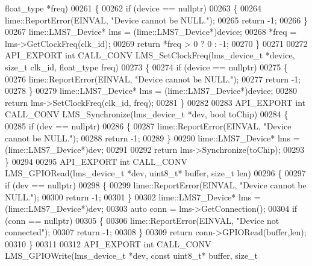 \begin{DoxyCode}
      float_type *freq)
00261 \{
00262     \textcolor{keywordflow}{if} (device == \textcolor{keyword}{nullptr})
00263     \{
00264         lime::ReportError(EINVAL, \textcolor{stringliteral}{"Device cannot be NULL."});
00265         \textcolor{keywordflow}{return} -1;
00266     \}
00267     lime::LMS7_Device* lms = (lime::LMS7_Device*)device;
00268     *freq = lms->GetClockFreq(clk\_id);
00269     \textcolor{keywordflow}{return} *freq > 0 ? 0 : -1;
00270 \}
00271 
00272 API_EXPORT \textcolor{keywordtype}{int} CALL_CONV LMS_SetClockFreq(lms_device_t *device, \textcolor{keywordtype}{size\_t} clk_id, 
      float_type freq)
00273 \{
00274     \textcolor{keywordflow}{if} (device == \textcolor{keyword}{nullptr})
00275     \{
00276         lime::ReportError(EINVAL, \textcolor{stringliteral}{"Device cannot be NULL."});
00277         \textcolor{keywordflow}{return} -1;
00278     \}
00279     lime::LMS7_Device* lms = (lime::LMS7_Device*)device;
00280     \textcolor{keywordflow}{return} lms->SetClockFreq(clk\_id, freq);
00281 \}
00282 
00283 API_EXPORT  \textcolor{keywordtype}{int} CALL_CONV LMS_Synchronize(lms_device_t *dev, \textcolor{keywordtype}{bool} toChip)
00284 \{
00285     \textcolor{keywordflow}{if} (dev == \textcolor{keyword}{nullptr})
00286     \{
00287         lime::ReportError(EINVAL, \textcolor{stringliteral}{"Device cannot be NULL."});
00288         \textcolor{keywordflow}{return} -1;
00289     \}
00290     lime::LMS7_Device* lms = (lime::LMS7_Device*)dev;
00291 
00292     \textcolor{keywordflow}{return} lms->Synchronize(toChip);
00293 \}
00294 
00295 API_EXPORT \textcolor{keywordtype}{int} CALL_CONV LMS_GPIORead(lms_device_t *dev,  uint8\_t* buffer, \textcolor{keywordtype}{size\_t} 
      len)
00296 \{
00297     \textcolor{keywordflow}{if} (dev == \textcolor{keyword}{nullptr})
00298     \{
00299         lime::ReportError(EINVAL, \textcolor{stringliteral}{"Device cannot be NULL."});
00300         \textcolor{keywordflow}{return} -1;
00301     \}
00302     lime::LMS7_Device* lms = (lime::LMS7_Device*)dev;
00303     \textcolor{keyword}{auto} conn = lms->GetConnection();
00304     \textcolor{keywordflow}{if} (conn == \textcolor{keyword}{nullptr})
00305     \{
00306         lime::ReportError(EINVAL, \textcolor{stringliteral}{"Device not connected"});
00307         \textcolor{keywordflow}{return} -1;
00308     \}
00309     \textcolor{keywordflow}{return} conn->GPIORead(buffer,len);
00310 \}
00311 
00312 API_EXPORT \textcolor{keywordtype}{int} CALL_CONV LMS_GPIOWrite(lms_device_t *dev, \textcolor{keyword}{const} uint8\_t* buffer, \textcolor{keywordtype}{size\_t} 

\end{DoxyCode}
